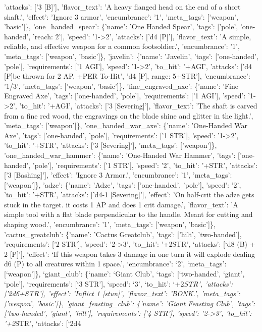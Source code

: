 \documentclass[
  letterpaper,
  DIV=11,
  numbers=noendperiod]{scrartcl}
\begin{document}
{'attacks': {[}'3 {[}B{]}'{]}, 'flavor\_text': 'A heavy flanged head on
the end of a short shaft.', 'effect': 'Ignore 3 armor', 'encumbrance':
'1', 'meta\_tags': {[}'weapon', 'basic'{]}\}, 'one\_handed\_spear':
\{'name': 'One Handed Spear', 'tags': {[}'pole', 'one-handed', 'reach:
2'{]}, 'speed': '1-\textgreater2', 'attacks': {[}'d4 {[}P{]}'{]},
'flavor\_text': 'A simple, reliable, and effective weapon for a common
footsoldier.', 'encumbrance': '1', 'meta\_tags': {[}'weapon',
'basic'{]}\}, 'javelin': \{'name': 'Javelin', 'tags': {[}'one-handed',
'pole'{]}, 'requirements': {[}'1 AGI'{]}, 'speed': '1-\textgreater2',
'to\_hit': '+AGI', 'attacks': {[}'d4 {[}P{]}\nCan be thrown for 2 AP,
+PER To-Hit', 'd4 {[}P{]}, range: 5+STR'{]}, 'encumbrance': '1/3',
'meta\_tags': {[}'weapon', 'basic'{]}\}, 'fine\_engraved\_axe':
\{'name': 'Fine Engraved Axe', 'tags': {[}'one-handed', 'pole'{]},
'requirements': {[}'1 AGI'{]}, 'speed': '1-\textgreater2', 'to\_hit':
'+AGI', 'attacks': {[}'3 {[}Severing{]}'{]}, 'flavor\_text': 'The shaft
is carved from a fine red wood, the engravings on the blade shine and
glitter in the light.', 'meta\_tags': {[}'weapon'{]}\},
'one\_handed\_war\_axe': \{'name': 'One-Handed War Axe', 'tags':
{[}'one-handed', 'pole'{]}, 'requirements': {[}'1 STR'{]}, 'speed':
'1-\textgreater2', 'to\_hit': '+STR', 'attacks': {[}'3
{[}Severing{]}'{]}, 'meta\_tags': {[}'weapon'{]}\},
'one\_handed\_war\_hammer': \{'name': 'One-Handed War Hammer', 'tags':
{[}'one-handed', 'pole'{]}, 'requirements': {[}'1 STR'{]}, 'speed': '2',
'to\_hit': '+STR', 'attacks': {[}'3 {[}Bashing{]}'{]}, 'effect': 'Ignore
3 Armor.', 'encumbrance': '1', 'meta\_tags': {[}'weapon'{]}\}, 'adze':
\{'name': 'Adze', 'tags': {[}'one-handed', 'pole'{]}, 'speed': '2',
'to\_hit': '+STR', 'attacks': {[}'d4-1 {[}Severing{]}'{]}, 'effect': 'On
half-crit the adze gets stuck in the target. \nRemoving it costs 1 AP
and does 1 crit damage.', 'flavor\_text': 'A simple tool with a flat
blade perpendicular to the handle. Meant for cutting and shaping wood.',
'encumbrance': '1', 'meta\_tags': {[}'weapon', 'basic'{]}\},
'cactus\_greatclub': \{'name': 'Cactus Greatclub', 'tags': {[}'hilt',
'two-handed'{]}, 'requirements': {[}'2 STR'{]}, 'speed':
'2-\textgreater3', 'to\_hit': '+2}STR', `attacks': {[}`d8 (B) + 2
{[}P{]}'{]}, `effect': `If this weapon takes 3 damage in one turn it
will explode dealing d6 (P) to all creatures within 1 space.',
`encumbrance': `2', `meta\_tags': {[}`weapon'{]}\}, `giant\_club':
\{`name': `Giant Club', `tags': {[}`two-handed', `giant', `pole'{]},
`requirements': {[}`3 STR'{]}, `speed': `3', `to\_hit': `+2\emph{STR',
'attacks': {[}'2d6+STR'{]}, 'effect': 'Inflict 1 {[}stun{]}',
'flavor\_text': 'BONK.', 'meta\_tags': {[}'weapon', 'basic'{]}\},
'giant\_feasting\_club': \{'name': 'Giant Feasting Club', 'tags':
{[}'two-handed', 'giant', 'hilt'{]}, 'requirements': {[}'4 STR'{]},
'speed': '2-\textgreater3', 'to\_hit': '+2}STR', `attacks': {[}`2d4
\end{document}
